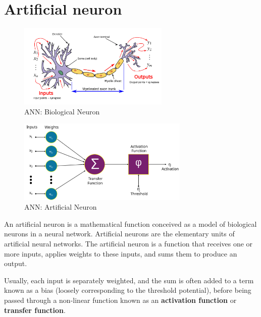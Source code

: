 \section{Artificial neuron \cite{wiki-Artificial_neuron}}\label{Artificial neuron}
\begin{table}[H]
    \begin{minipage}{0.45\textwidth}
        \begin{figure}[H]
            \centering
            \includegraphics[height=4cm]{Pictures/deep_neural_networks/bio_neuron.jpg}
            \caption{ANN: Biological Neuron}
        \end{figure}
    \end{minipage}
    \hfill
    \begin{minipage}{0.45\textwidth}
        \begin{figure}[H]
            \centering
            \includegraphics[height=4cm]{Pictures/deep_neural_networks/Artificial_neuron_structure.jpg}
            \caption{ANN: Artificial Neuron}
        \end{figure}
    \end{minipage}
\end{table}


An artificial neuron is a mathematical function conceived as a model of biological neurons in a neural network. Artificial neurons are the elementary units of artificial neural networks. The artificial neuron is a function that receives one or more inputs, applies weights to these inputs, and sums them to produce an output.


Usually, each input is separately weighted, and the sum is often added to a term known as a bias (loosely corresponding to the threshold potential), before being passed through a non-linear function known as an \textbf{activation function} or \textbf{transfer function}.

